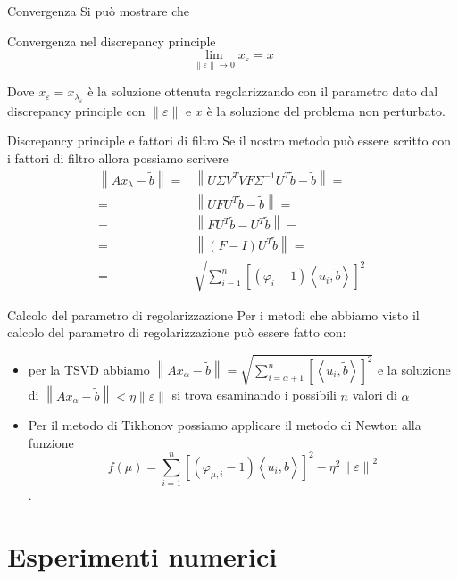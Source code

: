 \documentclass{beamer}
\theoremstyle{plain}
\theoremstyle{definition}
\theoremstyle{remark}
\newcommand{\pa}[1]{\left(#1\right)}
\newcommand{\ang}[1]{\left<#1\right>}
\newcommand{\bra}[1]{\left[#1\right]}
\newcommand{\norm}[1]{\left\|#1\right\|}
\begin{document}
\begin{frame}{Convergenza}
  Si può mostrare che
  \begin{block}{Convergenza nel discrepancy principle}
    \[ \lim \limits _{\norm{\varepsilon} \to 0} x _\varepsilon = x \]
  \end{block}
  Dove $x_\varepsilon = x_{\lambda _ \varepsilon}$ è la soluzione
  ottenuta regolarizzando con il parametro dato dal discrepancy
  principle con $\norm{\varepsilon}$ e $x$ è la soluzione del problema
  non perturbato.
\end{frame}

\begin{frame}{Discrepancy principle e fattori di filtro}
  Se il nostro metodo può essere scritto con i fattori di filtro
  allora possiamo scrivere
  \begin{align*}
    \norm{ Ax_\lambda - \tilde b } =& \norm{ U \Sigma V^T V F \Sigma
      ^{-1} U^T \tilde b - \tilde b} =\\
    =& \norm { U F U^T \tilde b - \tilde b} =\\
    = & \norm{ F U^T \tilde b - U^T \tilde b } =\\
    =& \norm{ \pa{F-I} U^T \tilde b} =\\
    =& \sqrt{\sum _{i=1} ^n \bra{ \pa{ \varphi _i -1} \ang{ u_i, \tilde b} } ^2}
  \end{align*}
\end{frame}

\begin{frame}{Calcolo del parametro di regolarizzazione}
  Per i metodi che abbiamo visto il calcolo del parametro di
  regolarizzazione può essere fatto con:
  \begin{itemize}
  \item per la TSVD abbiamo $\norm{ Ax_\alpha - \tilde b } =
    \sqrt{\sum _{i=\alpha +1} ^n \bra{ \ang{ u_i, \tilde b} } ^2 }$ e
    la soluzione di $\norm{ Ax_\alpha - \tilde b } <\eta
    \norm{\varepsilon}$ si trova esaminando i possibili $n$ valori di
    $\alpha$
  \item Per il metodo di Tikhonov possiamo applicare il metodo di
    Newton alla funzione \[f(\mu) = \sum _{i=1} ^n \bra{ \pa{ \varphi
        _{\mu,i} -1} \ang{ u_i, \tilde b} } ^2 - \eta ^2
    \norm{\varepsilon} ^2 \].
  \end{itemize}
\end{frame}

\section{Esperimenti numerici}
\end{document}
